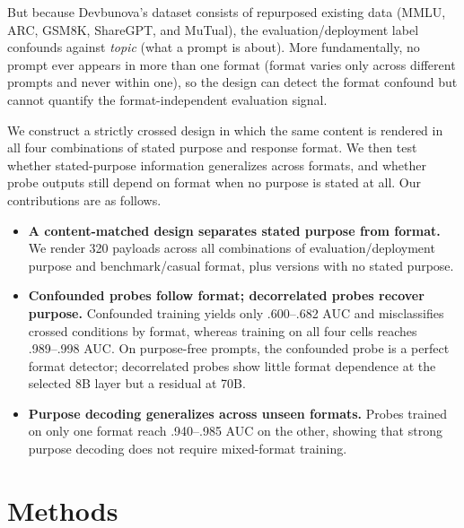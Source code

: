 \documentclass{article}
\begin{document}
But because Devbunova's dataset consists of repurposed existing data (MMLU, ARC, GSM8K, ShareGPT, and MuTual), the evaluation/deployment label confounds against \textit{topic} (what a prompt is about). More fundamentally, no prompt ever appears in more than one format (format varies only across different prompts and never within one), so the design can detect the format confound but cannot quantify the format-independent evaluation signal.


We construct a strictly crossed design in which the same content is rendered in all four combinations of stated purpose and response format. We then test whether stated-purpose information generalizes across formats, and whether probe outputs still depend on format when no purpose is stated at all. Our contributions are as follows.


\begin{itemize}

\item \textbf{A content-matched design separates stated purpose from format.}
We render 320 payloads across all combinations of evaluation/deployment purpose and benchmark/casual format, plus versions with no stated purpose.

\item \textbf{Confounded probes follow format; decorrelated probes recover purpose.}
Confounded training yields only .600--.682 AUC and misclassifies crossed conditions by format, whereas training on all four cells reaches .989--.998 AUC. On purpose-free prompts, the confounded probe is a perfect format detector; decorrelated probes show little format dependence at the selected 8B layer but a residual at 70B.

\item \textbf{Purpose decoding generalizes across unseen formats.}
Probes trained on only one format reach .940--.985 AUC on the other, showing that strong purpose decoding does not require mixed-format training.

\end{itemize}



\section{Methods}

\begingroup
\end{document}
